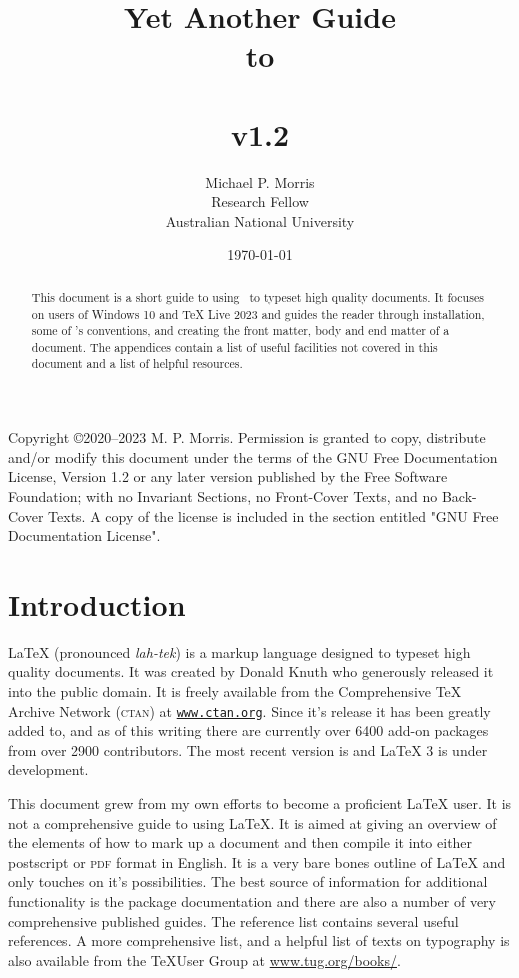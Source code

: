 \documentclass[12pt, a4paper]{article}
\title{
Yet Another Guide \\
to \\
\LaTeXe \\ 
{\Large v1.2} \\}
\author{Michael P. Morris \\ 
{\small Research Fellow} \\
{\small Australian National University} \\
}
\date{\today}
\begin{document}
\maketitle
\thispagestyle{empty}

\begin{abstract}
This document is a short guide to using \LaTeXe\ to typeset high quality documents. It focuses on users of Windows 10 and TeX Live 2023 and guides the reader through installation, some of \LaTeXe's conventions, and creating the front matter, body and end matter of a document. The appendices contain a list of useful facilities not covered in this document and a list of helpful resources.
\end{abstract}



{}
\tableofcontents

\clearpage
\listoffigures

\clearpage
\listoftables

\clearpage
{}


Copyright \copyright  2020--2023  M. P. Morris. Permission is granted to copy, distribute and/or modify this document under the terms of the GNU Free Documentation License, Version 1.2 or any later version published by the Free Software Foundation; with no Invariant Sections, no Front-Cover Texts, and no Back-Cover Texts. A copy of the license is included in the section entitled "GNU Free Documentation License".


\clearpage

\section{Introduction}

LaTeX (pronounced \emph{lah-tek}) is a markup language designed to typeset high quality documents. It was created by Donald Knuth who generously released it into the public domain. It is freely available from the Comprehensive TeX Archive Network (\textsc{ctan}) at \texttt{\url{www.ctan.org}}. Since it’s release it has been greatly added to, and as of this writing there are currently over 6400 add-on packages from over 2900 contributors. The most recent version is \LaTeXe and LaTeX 3 is under development. 

This document grew from my own efforts to become a proficient LaTeX user. It is not a comprehensive guide to using LaTeX. It is aimed at giving an overview of the elements of how to mark up a document and then compile it into either postscript or \textsc{pdf} format in English. It is a very bare bones outline of LaTeX and only touches on it's possibilities. The best source of information for additional functionality is the package documentation and there are also a number of very comprehensive published guides. The reference list contains several useful references. A more comprehensive list, and a helpful list of texts on typography is also available from the \TeX User Group at \url{www.tug.org/books/}. 
\end{document}
